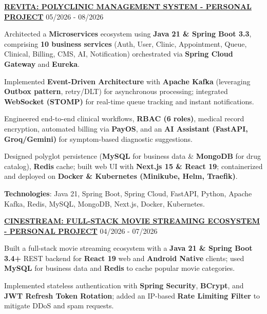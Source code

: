 \Needspace{0.45\textheight}
\begin{cventries} %

    \cvsimpleentry
    {\href{https://github.com/daoductam/revita-microservice}{\textbf{REVITA: POLYCLINIC MANAGEMENT SYSTEM - PERSONAL PROJECT}}} %
    {05/2026 - 08/2026} %
    {
      \begin{cvitems} %
        \item {Architected a \textbf{Microservices} ecosystem using \textbf{Java 21 \& Spring Boot 3.3}, comprising \textbf{10 business services} (Auth, User, Clinic, Appointment, Queue, Clinical, Billing, CMS, AI, Notification) orchestrated via \textbf{Spring Cloud Gateway} and \textbf{Eureka}.}
        \item {Implemented \textbf{Event-Driven Architecture} with \textbf{Apache Kafka} (leveraging \textbf{Outbox pattern}, retry/DLT) for asynchronous processing; integrated \textbf{WebSocket (STOMP)} for real-time queue tracking and instant notifications.}
        \item {Engineered end-to-end clinical workflows, \textbf{RBAC (6 roles)}, medical record encryption, automated billing via \textbf{PayOS}, and an \textbf{AI Assistant (FastAPI, Groq/Gemini)} for symptom-based diagnostic suggestions.}
        \item {Designed polyglot persistence (\textbf{MySQL} for business data \& \textbf{MongoDB} for drug catalog), \textbf{Redis} cache; built web UI with \textbf{Next.js 15 \& React 19}; containerized and deployed on \textbf{Docker \& Kubernetes (Minikube, Helm, Traefik)}.}
        \item {\textbf{Technologies}: Java 21, Spring Boot, Spring Cloud, FastAPI, Python, Apache Kafka, Redis, MySQL, MongoDB, Next.js, Docker, Kubernetes.}
      \end{cvitems}
    }
  \cvsimpleentry
    {\href{https://github.com/daoductam/web-film-vibe}{\textbf{CINESTREAM: FULL-STACK MOVIE STREAMING ECOSYSTEM - PERSONAL PROJECT}}} %
    {04/2026 - 07/2026} %
    {
      \begin{cvitems} %
        \item {Built a full-stack movie streaming ecosystem with a \textbf{Java 21 \& Spring Boot 3.4+} REST backend for \textbf{React 19} web and \textbf{Android Native} clients; used \textbf{MySQL} for business data and \textbf{Redis} to cache popular movie categories.}
        \item {Implemented stateless authentication with \textbf{Spring Security}, \textbf{BCrypt}, and \textbf{JWT Refresh Token Rotation}; added an IP-based \textbf{Rate Limiting Filter} to mitigate DDoS and spam requests.}

\end{cvitems}}
\end{cventries}
